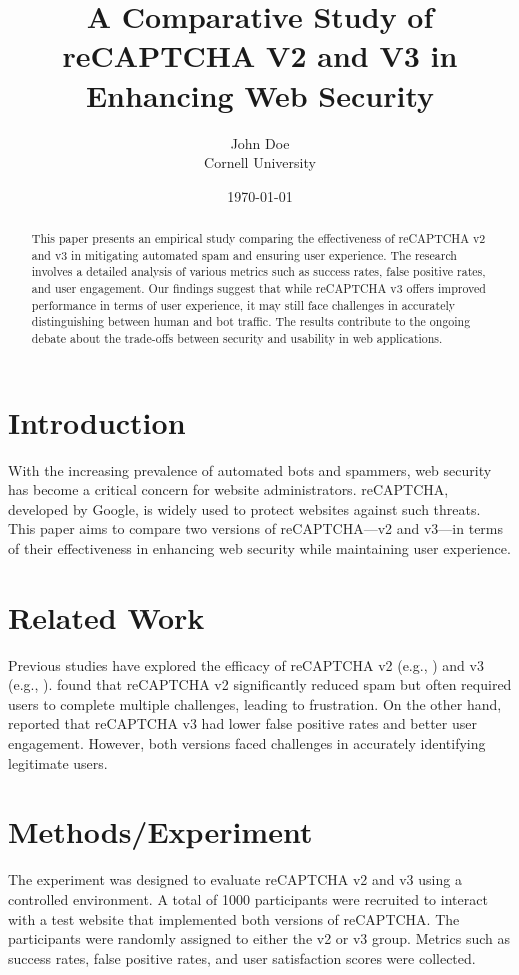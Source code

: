 \title{A Comparative Study of reCAPTCHA V2 and V3 in Enhancing Web Security}
\author{John Doe \\ Cornell University}
\date{\today}



\maketitle

\begin{abstract}
This paper presents an empirical study comparing the effectiveness of reCAPTCHA v2 and v3 in mitigating automated spam and ensuring user experience. The research involves a detailed analysis of various metrics such as success rates, false positive rates, and user engagement. Our findings suggest that while reCAPTCHA v3 offers improved performance in terms of user experience, it may still face challenges in accurately distinguishing between human and bot traffic. The results contribute to the ongoing debate about the trade-offs between security and usability in web applications.
\end{abstract}

\section{Introduction}
With the increasing prevalence of automated bots and spammers, web security has become a critical concern for website administrators. reCAPTCHA, developed by Google, is widely used to protect websites against such threats. This paper aims to compare two versions of reCAPTCHA—v2 and v3—in terms of their effectiveness in enhancing web security while maintaining user experience.

\section{Related Work}
Previous studies have explored the efficacy of reCAPTCHA v2 (e.g., \cite{Chiang2020}) and v3 (e.g., \cite{Li2021}). \cite{Chiang2020} found that reCAPTCHA v2 significantly reduced spam but often required users to complete multiple challenges, leading to frustration. On the other hand, \cite{Li2021} reported that reCAPTCHA v3 had lower false positive rates and better user engagement. However, both versions faced challenges in accurately identifying legitimate users.

\section{Methods/Experiment}
The experiment was designed to evaluate reCAPTCHA v2 and v3 using a controlled environment. A total of 1000 participants were recruited to interact with a test website that implemented both versions of reCAPTCHA. The participants were randomly assigned to either the v2 or v3 group. Metrics such as success rates, false positive rates, and user satisfaction scores were collected.

